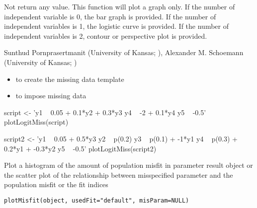\documentclass[a4paper]{book}
\begin{document}
%
\begin{Value}
Not return any value. This function will plot a graph only. If the number of independent variable is 0, the bar graph is provided. If the number of independent variables is 1, the logistic curve is provided. If the number of independent variables is 2, contour or perspective plot is provided.
\end{Value}
%
\begin{Author}\relax
Sunthud Pornprasertmanit (University of Kansas; ), Alexander M. Schoemann (University of Kansas; )
\end{Author}
%
\begin{SeeAlso}\relax
\begin{itemize}

\item {} to create the missing data template
\item {} to impose missing data

\end{itemize}

\end{SeeAlso}
%
\begin{Examples}
\begin{ExampleCode}
script <- 'y1 ~ 0.05 + 0.1*y2 + 0.3*y3
	y4 ~ -2 + 0.1*y4
	y5 ~ -0.5' 
plotLogitMiss(script)

script2 <- 'y1 ~ 0.05 + 0.5*y3
	y2 ~ p(0.2)
	y3 ~ p(0.1) + -1*y1
	y4 ~ p(0.3) + 0.2*y1 + -0.3*y2
	y5 ~ -0.5' 
plotLogitMiss(script2)
\end{ExampleCode}
\end{Examples}
%
\begin{Description}\relax
Plot a histogram of the amount of population misfit in parameter result object or the scatter plot of the relationship between misspecified parameter and the population misfit or the fit indices
\end{Description}
%
\begin{Usage}
\begin{verbatim}
plotMisfit(object, usedFit="default", misParam=NULL)
\end{verbatim}
\end{Usage}
%
\end{document}
